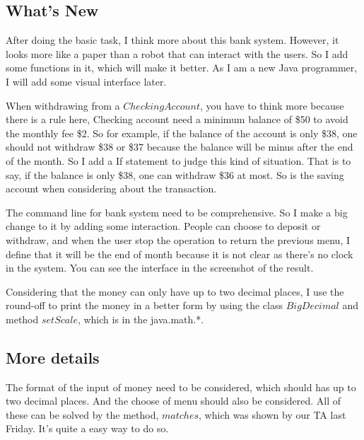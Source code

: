 \documentclass{article}
\begin{document}
\subsection{What's New}
After doing the basic task, I think more about this bank system. However, it looks more like a paper than a robot that can interact with the users. So I add some functions in it, which will make it better. As I am a new Java programmer, I will add some visual interface later.
\begin{compactitem}
\item When withdrawing from a $CheckingAccount$, you have to think more because there is a rule here, Checking account need a minimum balance of \$50 to avoid the monthly fee \$2. So for example, if the balance of the account is only \$38, one should not withdraw \$38 or \$37 because the balance will be minus after the end of the month. So I add a If statement to judge this kind of situation. That is to say, if the balance is only \$38, one can withdraw \$36 at most. So is the saving account when considering about the transaction.

\item The command line for bank system need to be comprehensive. So I make a big change to it by adding some interaction. People can choose to deposit or withdraw, and when the user stop the operation to return the previous menu, I define that it will be the end of month because it is not clear as there's no clock in the system. You can see the interface in the screenshot of the result.

\item Considering that the money can only have up to two decimal places, I use the round-off to print the money in a better form by using the class $BigDecimal$ and method $setScale$, which is in the java.math.*.

\end{compactitem}

\subsection{More details}
The format of the input of money need to be considered, which should has up to two decimal places. And the choose of menu should also be considered. All of these can be solved by the method, $matches$, which was shown by our TA last Friday.
It's quite a easy way to do so.

\end{document}
